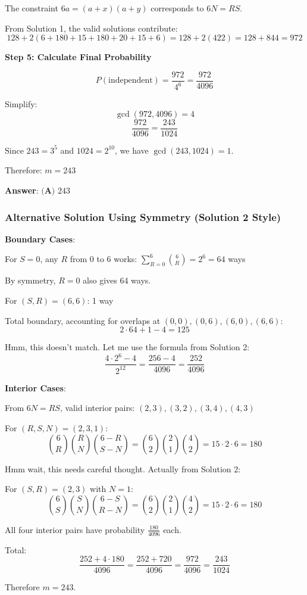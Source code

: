 \documentclass[12pt]{article}
\begin{document}
\begin{solutionbox}
The constraint $6a = (a+x)(a+y)$ corresponds to $6N = RS$.

From Solution 1, the valid solutions contribute:
$$128 + 2(6 + 180 + 15 + 180 + 20 + 15 + 6) = 128 + 2(422) = 128 + 844 = 972$$

\textbf{Step 5: Calculate Final Probability}

$$P(\text{independent}) = \frac{972}{4^6} = \frac{972}{4096}$$

Simplify:
$$\gcd(972, 4096) = 4$$
$$\frac{972}{4096} = \frac{243}{1024}$$

Since $243 = 3^5$ and $1024 = 2^{10}$, we have $\gcd(243, 1024) = 1$.

Therefore: $m = 243$

\textbf{Answer}: $\boxed{\textbf{(A) } 243}$

\subsubsection*{Alternative Solution Using Symmetry (Solution 2 Style)}

\textbf{Boundary Cases}:

For $S = 0$, any $R$ from 0 to 6 works: $\sum_{R=0}^{6} \binom{6}{R} = 2^6 = 64$ ways

By symmetry, $R = 0$ also gives 64 ways.

For $(S, R) = (6, 6)$: 1 way

Total boundary, accounting for overlaps at $(0,0), (0,6), (6,0), (6,6)$:
$$2 \cdot 64 + 1 - 4 = 125$$

Hmm, this doesn't match. Let me use the formula from Solution 2:
$$\frac{4 \cdot 2^6 - 4}{2^{12}} = \frac{256 - 4}{4096} = \frac{252}{4096}$$

\textbf{Interior Cases}:

From $6N = RS$, valid interior pairs: $(2,3), (3,2), (3,4), (4,3)$

For $(R, S, N) = (2, 3, 1)$:
$$\binom{6}{R} \binom{R}{N} \binom{6-R}{S-N} = \binom{6}{2} \binom{2}{1} \binom{4}{2} = 15 \cdot 2 \cdot 6 = 180$$

Hmm wait, this needs careful thought. Actually from Solution 2:

For $(S, R) = (2, 3)$ with $N = 1$:
$$\binom{6}{S} \binom{S}{N} \binom{6-S}{R-N} = \binom{6}{2} \binom{2}{1} \binom{4}{2} = 15 \cdot 2 \cdot 6 = 180$$

All four interior pairs have probability $\frac{180}{4096}$ each.

Total:
$$\frac{252 + 4 \cdot 180}{4096} = \frac{252 + 720}{4096} = \frac{972}{4096} = \frac{243}{1024}$$

Therefore $m = \boxed{243}$.

\end{solutionbox}
\end{document}
